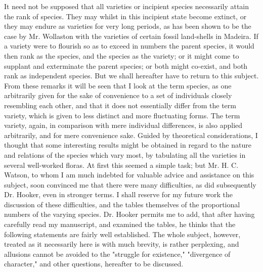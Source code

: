 It need not be supposed that all varieties or incipient species necessarily attain the rank of species. They may whilst in this incipient state become extinct, or they may endure as varieties for very long periods, as has been shown to be the case by Mr. Wollaston with the varieties of certain fossil land-shells in Madeira. If a variety were to flourish so as to exceed in numbers the parent species, it would then rank as the species, and the species as the variety; or it might come to supplant and exterminate the parent species; or both might co-exist, and both rank as independent species. But we shall hereafter have to return to this subject.
From these remarks it will be seen that I look at the term species, as one arbitrarily given for the sake of convenience to a set of individuals closely resembling each other, and that it does not essentially differ from the term variety, which is given to less distinct and more fluctuating forms. The term variety, again, in comparison with mere individual differences, is also applied arbitrarily, and for mere convenience sake.
Guided by theoretical considerations, I thought that some interesting results might be obtained in regard to the nature and relations of the species which vary most, by tabulating all the varieties in several well-worked floras. At first this seemed a simple task; but Mr. H. C. Watson, to whom I am much indebted for valuable advice and assistance on this subject, soon convinced me that there were many difficulties, as did subsequently Dr. Hooker, even in stronger terms. I shall reserve for my future work the discussion of these difficulties, and the tables themselves of the proportional numbers of the varying species. Dr. Hooker permits me to add, that after having carefully read my manuscript, and examined the tables, he thinks that the following statements are fairly well established. The whole subject, however, treated as it necessarily here is with much brevity, is rather perplexing, and allusions cannot be avoided to the "struggle for existence," "divergence of character," and other questions, hereafter to be discussed.
